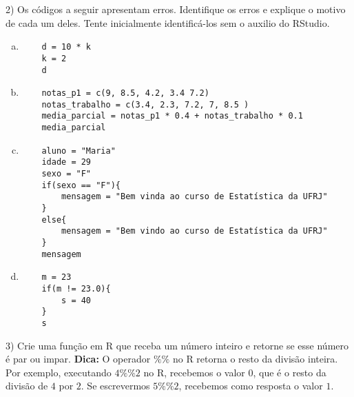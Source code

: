 \documentclass{article}
\begin{document}
2) Os códigos a seguir apresentam erros. Identifique os erros e explique o motivo de cada um deles. Tente inicialmente identificá-los sem o auxilio do RStudio. 

\begin{enumerate}[a)]

    \item
\begin{verbatim}
    d = 10 * k
    k = 2
    d
\end{verbatim}
        
        \item
\begin{verbatim}
    notas_p1 = c(9, 8.5, 4.2, 3.4 7.2)
    notas_trabalho = c(3.4, 2.3, 7.2, 7, 8.5 )
    media_parcial = notas_p1 * 0.4 + notas_trabalho * 0.1
    media_parcial  
\end{verbatim}

    \item 
    
\begin{verbatim}
    aluno = "Maria"
    idade = 29
    sexo = "F"
    if(sexo == "F"){
        mensagem = "Bem vinda ao curso de Estatística da UFRJ"
    }
    else{
        mensagem = "Bem vindo ao curso de Estatística da UFRJ"
    }
    mensagem
\end{verbatim}

    \item 
\begin{verbatim}
    m = 23
    if(m != 23.0){
        s = 40
    }
    s
\end{verbatim}
\end{enumerate}


3) Crie uma função em R que receba um número inteiro e retorne se esse número é par ou impar. 
\textbf{Dica:} O operador $\%\%$ no R retorna o resto da divisão inteira. Por exemplo, 
executando $4\%\%2$ no R, recebemos o valor 0, que é o resto da divisão de $4$ por $2$. Se escrevermos  $5\%\%2$, recebemos como resposta o valor $1$. 
\end{document}
